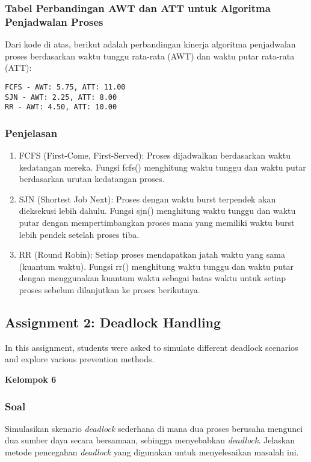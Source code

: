 \documentclass[12pt]{article}
\begin{document}
\subsubsection{Tabel Perbandingan AWT dan ATT untuk Algoritma Penjadwalan Proses}
Dari kode di atas, berikut adalah perbandingan kinerja algoritma penjadwalan proses berdasarkan waktu tunggu rata-rata (AWT) dan waktu putar rata-rata (ATT):
\begin{verbatim}
FCFS - AWT: 5.75, ATT: 11.00
SJN - AWT: 2.25, ATT: 8.00
RR - AWT: 4.50, ATT: 10.00
\end{verbatim}

\subsubsection{Penjelasan}
\begin{enumerate}
    \item{FCFS (First-Come, First-Served)}: Proses dijadwalkan berdasarkan waktu kedatangan mereka. Fungsi fcfs() menghitung waktu tunggu dan waktu putar berdasarkan urutan kedatangan proses.
    \item{SJN (Shortest Job Next)}: Proses dengan waktu burst terpendek akan dieksekusi lebih dahulu. Fungsi sjn() menghitung waktu tunggu dan waktu putar dengan mempertimbangkan proses mana yang memiliki waktu burst lebih pendek setelah proses tiba.
    \item{RR (Round Robin)}: Setiap proses mendapatkan jatah waktu yang sama (kuantum waktu). Fungsi rr() menghitung waktu tunggu dan waktu putar dengan menggunakan kuantum waktu sebagai batas waktu untuk setiap proses sebelum dilanjutkan ke proses berikutnya.
\end{enumerate}

\subsection{Assignment 2: Deadlock Handling}
In this assignment, students were asked to simulate different deadlock scenarios and explore various prevention methods.

\vspace{0.5cm}
\textbf{Kelompok 6}
\subsubsection{Soal}
Simulasikan skenario \textit{deadlock} sederhana di mana dua proses berusaha mengunci dua sumber daya secara bersamaan, sehingga menyebabkan \textit{deadlock}. Jelaskan metode pencegahan \textit{deadlock} yang digunakan untuk menyelesaikan masalah ini.
\end{document}
